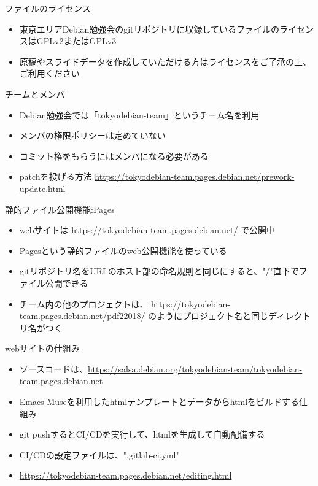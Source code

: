 \begin{frame}[containsverbatim]{ファイルのライセンス}
  \begin{itemize}
  \item 東京エリアDebian勉強会のgitリポジトリに収録しているファイルのライセンスはGPLv2またはGPLv3
  \item 原稿やスライドデータを作成していただける方はライセンスをご了承の上、ご利用ください
  \end{itemize}
\end{frame}

\begin{frame}[containsverbatim]{チームとメンバ}
  \begin{itemize}
  \item Debian勉強会では「tokyodebian-team」というチーム名を利用
  \item メンバの権限ポリシーは定めていない
  \item コミット権をもらうにはメンバになる必要がある
  \item patchを投げる方法 \url{https://tokyodebian-team.pages.debian.net/prework-update.html}
  \end{itemize}
\end{frame}

\begin{frame}[containsverbatim]{静的ファイル公開機能:Pages}
  \begin{itemize}
  \item webサイトは \url{https://tokyodebian-team.pages.debian.net/} で公開中
  \item Pagesという静的ファイルのweb公開機能を使っている
  \item gitリポジトリ名をURLのホスト部の命名規則と同じにすると、"/"直下でファイル公開できる
  \item チーム内の他のプロジェクトは、 https://tokyodebian-team.pages.debian.net/pdf22018/ のようにプロジェクト名と同じディレクトリ名がつく
  \end{itemize}
\end{frame}


\begin{frame}[containsverbatim]{webサイトの仕組み}
  \begin{itemize}
  \item ソースコードは、\url{https://salsa.debian.org/tokyodebian-team/tokyodebian-team.pages.debian.net}
  \item Emacs Museを利用したhtmlテンプレートとデータからhtmlをビルドする仕組み
  \item git pushするとCI/CDを実行して、htmlを生成して自動配備する
  \item CI/CDの設定ファイルは、".gitlab-ci.yml"
  \item \url{https://tokyodebian-team.pages.debian.net/editing.html}
  \end{itemize}
\end{frame}


